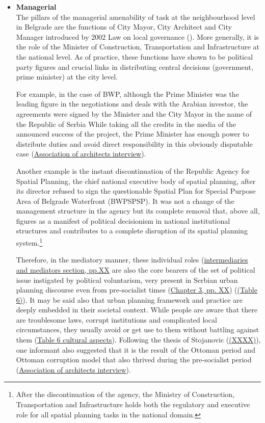 \documentclass[11pt]{report}
\begin{document}
\begin{itemize}
\item \textbf{Managerial}
\\
The pillars of the managerial amenability of task at the neighbourhood level in Belgrade are the functions of City Mayor, City Architect and City Manager introduced by 2002 Law on local governance (\cite{Vujovic and Petrovic, 2007}).
More generally, it is the role of the Minister of Construction, Transportation and Infrastructure at the national level.
As of practice, these functions have shown to be political party figures and crucial links in distributing central decisions (government, prime minister) at the city level.

For example, in the case of BWP, although the Prime Minister was the leading figure in the negotiations and deals with the Arabian investor, the agreements were signed by the Minister and the City Mayor in the name of the Republic of Serbia
While taking all the credits in the media of the announced success of the project, the Prime Minister has enough power to distribute duties and avoid direct responsibility in this obviously disputable case (\href{}{Association of architects interview}).

Another example is the instant discontinuation of the Republic Agency for Spatial Planning, the chief national executive body of spatial planning, after its director refused to sign the questionable Spatial Plan for Special Purpose Area of Belgrade Waterfront (BWPSPSP). It was not a change of the management structure in the agency but its complete removal that, above all, figures as a manifest of political decisionism in national institutional structures and contributes to a complete disruption of its spatial planning system.\footnote{After the discontinuation of the agency, the Ministry of Construction, Transportation and Infrastructure holds both the regulatory and executive role for all spatial planning tasks in the national domain.}

Therefore, in the mediatory manner, these individual roles (\href{}{intermediaries and mediators section, pp.XX} are also the core bearers of the set of political issue  instigated by political voluntarism, very present in Serbian urban planning discourse even from pre-socialist times (\href{}{Chapter 3, pp. XX}) (\href{}{(Table 6)}).
It may be said also that urban planning framework and practice are deeply embedded in their societal context.
While people are aware that there are troublesome laws, corrupt institutions and complicated local circumstances, they usually avoid or get use to them without battling against them (\href{}{Table 6 cultural aspects}).
Following the thesis of Stojanovic (\href{}{(XXXX)}), one informant also suggested that it is the result of the Ottoman period and Ottoman corruption model that also thrived during the pre-socialist period (\href{}{Association of architects  interview}).
\\


\end{itemize}
\end{document}
